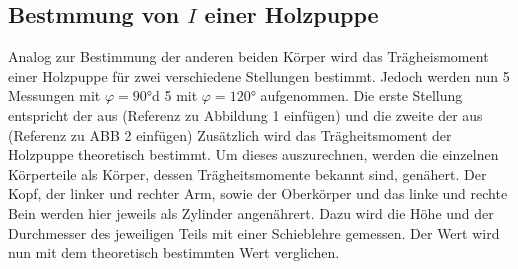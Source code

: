     \subsection{Bestmmung von $I$ einer Holzpuppe}
    Analog zur Bestimmung der anderen beiden Körper wird das Trägheismoment einer Holzpuppe für zwei verschiedene Stellungen bestimmt.
    Jedoch werden nun 5 Messungen mit $\varphi= 90$\unit{\degree}d 5  mit $\varphi= 120$\unit{\degree} aufgenommen.
    Die erste Stellung entspricht der aus (Referenz zu Abbildung 1 einfügen) und die zweite der aus (Referenz zu ABB 2 einfügen) %
    Zusätzlich wird das Trägheitsmoment der Holzpuppe theoretisch bestimmt.
    Um dieses auszurechnen, werden die einzelnen Körperteile als Körper, dessen Trägheitsmomente bekannt sind, genähert.
    Der Kopf, der linker und rechter Arm, sowie der Oberkörper und das linke und rechte Bein werden hier jeweils als Zylinder angenährert.
    Dazu wird die Höhe und der Durchmesser des jeweiligen Teils mit einer Schieblehre gemessen.
    Der Wert wird nun mit dem theoretisch bestimmten Wert verglichen.
